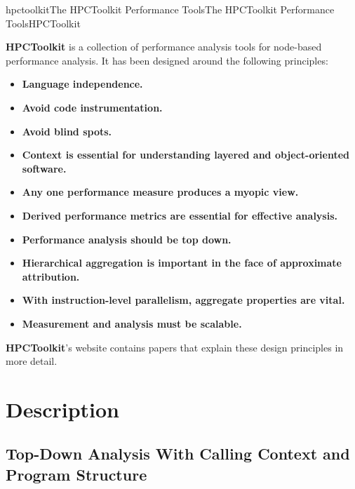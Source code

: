 \documentclass[english]{article}
\begin{document}
\begin{Name}{1}{hpctoolkit}{The HPCToolkit Performance Tools}{The HPCToolkit Performance Tools}{HPCToolkit}

\textbf{HPCToolkit} is a collection of performance analysis tools for node-based performance analysis.
It has been designed around the following principles:
\begin{itemize}

\item \textbf{Language independence.}
\item \textbf{Avoid code instrumentation.}
\item \textbf{Avoid blind spots.}
\item \textbf{Context is essential for understanding layered and object-oriented software.}
\item \textbf{Any one performance measure produces a myopic view.}
\item \textbf{Derived performance metrics are essential for effective analysis.}
\item \textbf{Performance analysis should be top down.}
\item \textbf{Hierarchical aggregation is important in the face of approximate attribution.} 
\item \textbf{With instruction-level parallelism, aggregate properties are vital.}
\item \textbf{Measurement and analysis must be scalable.}

\end{itemize}

\textbf{HPCToolkit}'s website contains papers that explain these design principles in more detail.

\end{Name}

\section{Description}

\subsection{Top-Down Analysis With Calling Context and Program Structure}
\end{document}
